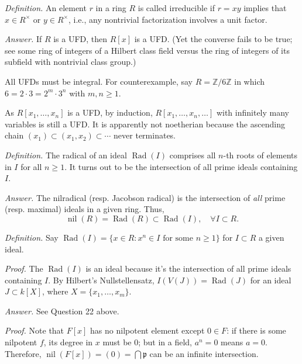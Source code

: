 \documentclass{mathproblems}
\newcommand\Z{\mathbb{Z}}
\DeclareMathOperator{\rad}{Rad}
\begin{document}
\begin{questions}
\textit{Definition.} An element $r$ in a ring $R$ is called irreducible if $r=xy$ implies that $x\in R^\times$ or $y\in R^\times$, i.e., any nontrivial factorization involves a unit factor. 

\textit{Answer.} If $R$ is a UFD, then $R[x]$ is a UFD. (Yet the converse fails to be true; see some ring of integers of a Hilbert class field versus the ring of integers of its subfield with nontrivial class group.) 

All UFDs must be integral. For counterexample, say $R=\Z/6\Z$ in which $6=2\cdot 3=2^m\cdot 3^n$ with $m,n\geqslant 1$.

As $R[x_1,\ldots,x_n]$ is a UFD, by induction, $R[x_1,\ldots,x_n,\ldots]$ with infinitely many variables is still a UFD. It is apparently not noetherian because the ascending chain $(x_1)\subset (x_1,x_2)\subset \cdots$ never terminates.



\textit{Definition.} The radical of an ideal $\rad (I)$ comprises all $n$-th roots of elements in $I$ for all $n\geqslant 1$. It turns out to be the intersection of all prime ideals containing $I$.

\textit{Answer.} The nilradical (resp. Jacobson radical) is the intersection of \textit{all} prime (resp. maximal) ideals in a given ring. Thus,
$$
\operatorname{nil}(R)=\rad(R)\subset\rad(I),\quad \forall I\subset R.
$$


\textit{Definition.} Say $\rad(I)=\{x\in R: x^n\in I \text{ for some } n\geqslant 1\}$ for $I\subset R$ a given ideal.

\textit{Proof.} The $\rad(I)$ is an ideal because it's the intersection of all prime ideals containing $I$. By Hilbert's Nullstellensatz, $I(V(J))=\rad (J)$ for an ideal $J\subset k[X]$, where $X=\{x_1,\ldots, x_m\}$.


\textit{Answer.} See Question 22 above.

\textit{Proof.} Note that $F[x]$ has no nilpotent element except $0\in F$: if there is some nilpotent $f$, its degree in $x$ must be 0; but in a field, $a^n=0$ means $a=0$. Therefore, $\operatorname{nil}(F[x])=(0)=\bigcap \mathfrak{p}$ can be an infinite intersection.


\end{questions}
\end{document}
